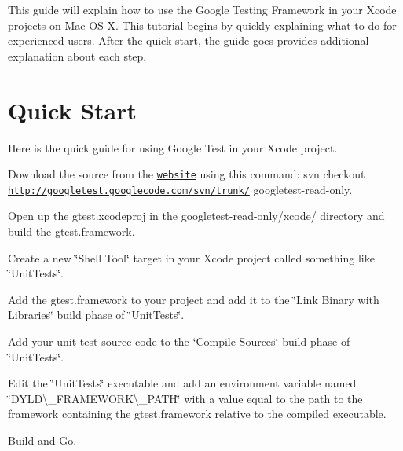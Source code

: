 This guide will explain how to use the Google Testing Framework in your Xcode projects on Mac OS X. This tutorial begins by quickly explaining what to do for experienced users. After the quick start, the guide goes provides additional explanation about each step.

\section*{Quick Start}

Here is the quick guide for using Google Test in your Xcode project.


\begin{DoxyEnumerate}
\item Download the source from the \href{https://github.com/google/googletest}{\tt website} using this command\+: {\ttfamily svn checkout \href{http://googletest.googlecode.com/svn/trunk/}{\tt http\+://googletest.\+googlecode.\+com/svn/trunk/} googletest-\/read-\/only}.
\end{DoxyEnumerate}
\begin{DoxyEnumerate}
\item Open up the {\ttfamily gtest.\+xcodeproj} in the {\ttfamily googletest-\/read-\/only/xcode/} directory and build the gtest.\+framework.
\end{DoxyEnumerate}
\begin{DoxyEnumerate}
\item Create a new \char`\"{}\+Shell Tool\char`\"{} target in your Xcode project called something like \char`\"{}\+Unit\+Tests\char`\"{}.
\end{DoxyEnumerate}
\begin{DoxyEnumerate}
\item Add the gtest.\+framework to your project and add it to the \char`\"{}\+Link Binary with Libraries\char`\"{} build phase of \char`\"{}\+Unit\+Tests\char`\"{}.
\end{DoxyEnumerate}
\begin{DoxyEnumerate}
\item Add your unit test source code to the \char`\"{}\+Compile Sources\char`\"{} build phase of \char`\"{}\+Unit\+Tests\char`\"{}.
\end{DoxyEnumerate}
\begin{DoxyEnumerate}
\item Edit the \char`\"{}\+Unit\+Tests\char`\"{} executable and add an environment variable named \char`\"{}\+D\+Y\+L\+D\textbackslash{}\+\_\+\+F\+R\+A\+M\+E\+W\+O\+R\+K\textbackslash{}\+\_\+\+P\+A\+T\+H\char`\"{} with a value equal to the path to the framework containing the gtest.\+framework relative to the compiled executable.
\end{DoxyEnumerate}
\begin{DoxyEnumerate}
\item Build and Go.
\end{DoxyEnumerate}

